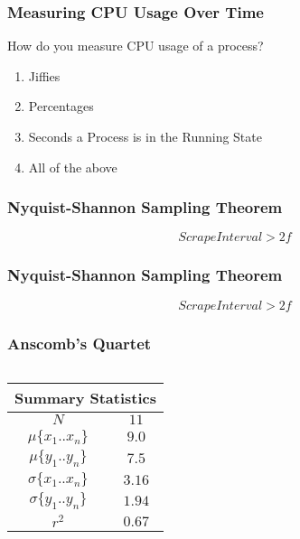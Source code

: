 \begin{frame}[fragile]
    \frametitle{Measuring CPU Usage Over Time}

    How do you measure CPU usage of a process?
    \begin{enumerate}[label=\alph*.]
        \item Jiffies
        \item Percentages
        \item Seconds a Process is in the Running State
        \item All of the above
    \end{enumerate}
\end{frame}

\begin{frame}
    \frametitle{Nyquist-Shannon Sampling Theorem}
    \begin{figure}[!h]
        \centering
        
    \end{figure}
    $$ Scrape Interval > 2f $$
\end{frame}
\begin{frame}
    \frametitle{Nyquist-Shannon Sampling Theorem}
    \begin{figure}[!h]
        \centering
        
    \end{figure}
    $$ Scrape Interval > 2f $$
\end{frame}



\begin{frame}
    \frametitle{Anscomb's Quartet}
    \begin{columns}
        \begin{column}{0.3\textwidth}
            \begin{center}
                \begin{tabular}{ c c }
                    \multicolumn{2}{c}{\textbf{Summary Statistics}} \\
                    \hline
                    $N$ & $11$ \\
                    $\mu\{x_1..x_n\}$ & $9.0$ \\
                    $\mu\{y_1..y_n\}$ & $7.5$ \\
                    $\sigma\{x_1..x_n\}$ & $3.16$ \\
                    $\sigma\{y_1..y_n\}$ & $1.94$ \\
                    $r^2$ & $0.67$
                \end{tabular}
            \end{center}
        \end{column}
        \begin{column}{0.7\textwidth}
            \begin{figure}[!h]
                \centering
                
            \end{figure}
        \end{column}
    \end{columns}
\end{frame}

